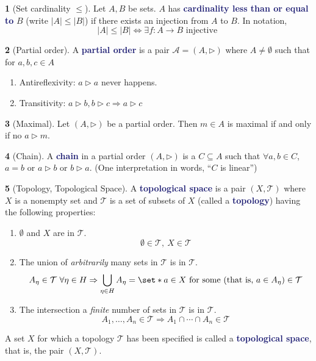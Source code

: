 \documentclass[11pt]{article}
\numberwithin{equation}{section}
\newcommand{\navy}[1]{\textcolor{MidnightBlue}{\bf #1}}
\theoremstyle{plain}
\theoremstyle{definition}
\newtheorem{definition}{\color{MidnightBlue}{\textbf{Definition}}}[section]
\newcommand\abs[1]{\left| #1 \right|}
\def\Set{\set*}%
\def\imp{\Rightarrow}
\newcommand{\1}{\mathbbm 1}
\newcommand{\aAA}{\mathcal A}
\newcommand{\tT}{\mathcal T}
\begin{document}
\begin{definition}[Set cardinality $\leq$]
Let $A, B$ be sets. $A$ has \navy{cardinality less than or equal to} $B$ (write $\abs{A} \leq \abs{B}$) if there exists an injection from $A$ to $B$. In notation,
\begin{equation}
\abs{A} \leq \abs{B} \iff \exists f:A \to B \text{ injective }
\end{equation}
\end{definition}

\begin{definition}[Partial order]
A \navy{partial order} is a pair $\aAA = (A, \triangleright)$ where $A \neq \emptyset$ such that  for $a,b,c \in A$
\begin{enumerate}
\item Antireflexivity: $a \triangleright a$ never happens.
\item Transitivity: $a \triangleright b, b \triangleright c \imp a \triangleright c$
\end{enumerate}
\end{definition}

\begin{definition}[Maximal]
Let $(A, \triangleright)$ be a partial order. Then $m \in A$ is maximal if and only if no $a \triangleright m$.
\end{definition}

\begin{definition}[Chain]
A \navy{chain} in a partial order $(A, \triangleright)$ is a $C \subseteq A$ such that $\forall a,b \in C$, $a=b$ or $a \triangleright b$ or $b \triangleright a$. (One interpretation in words, ``$C$ is linear'')
\end{definition}

\begin{definition}[Topology, Topological Space]
A \navy{topological space} is a pair $(X,\tT)$ where $X$ is a nonempty set and $\tT$ is a set of subsets of $X$ (called a \navy{topology}) having the following properties:
\begin{enumerate}
\item $\emptyset$ and $X$ are in $\tT$.
\begin{equation}
\emptyset \in \tT,\ X \in \tT
\end{equation}
\item The union of \textit{arbitrarily} many sets in $\tT$ is in $\tT$.
\begin{equation}
A_\eta \in \tT \ \forall \eta \in H \imp \bigcup_{\eta \in H} A_\eta = \Set{a \in X \text{ for some (that is, } a \in A_\eta \text{)}} \in \tT
\end{equation}
\item The intersection a \textit{finite} number of sets in $\tT$ is in $\tT$.
\begin{equation}
A_1, \ldots, A_n \in \tT \imp A_1 \cap \cdots \cap A_n \in \tT
\end{equation}
\end{enumerate}
A set $X$ for which a topology $\tT$ has been specified is called a \navy{topological space}, that is, the pair $(X,\tT)$.
\end{definition}
\end{document}
